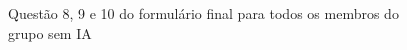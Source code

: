 \documentclass[english,brazilian]{UNISINOSartigo} %
\begin{document}
\begin{figure}[ht]
    \caption{Questão 8, 9 e 10 do formulário final para todos os membros do grupo sem IA}
    \label{fig:questao8_9_10_sem_ia}
    \centering
    \footnotesize
    \begin{minipage}{.9\textwidth}
        \centering
    \end{minipage}
\end{figure}
\FloatBarrier
\end{document}
